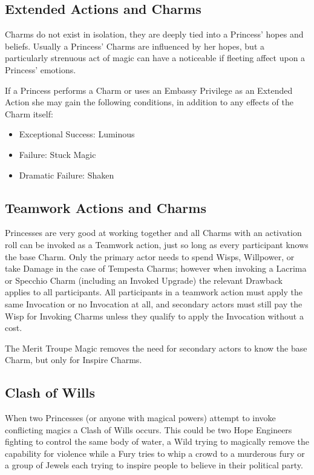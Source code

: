 \subsection*{Extended Actions and Charms}

Charms do not exist in isolation, they are deeply tied into a Princess' hopes and beliefs. Usually a Princess' Charms are influenced by her hopes, but a particularly strenuous act of magic can have a noticeable if fleeting affect upon a Princess' emotions. 

If a Princess performs a Charm or uses an Embassy Privilege as an Extended Action she may gain the following conditions, in addition to any effects of the Charm itself: 

\begin{itemize}
 \item Exceptional Success: Luminous
 \item Failure: Stuck Magic
 \item Dramatic Failure: Shaken
\end{itemize}

\subsection*{Teamwork Actions and Charms}

Princesses are very good at working together and all Charms with an activation roll can be invoked as a Teamwork action, just so long as every participant knows the base Charm. Only the primary actor needs to spend Wisps, Willpower, or take Damage in the case of Tempesta Charms; however when invoking a Lacrima or Specchio Charm (including an Invoked Upgrade) the relevant Drawback applies to all participants. All participants in a teamwork action must apply the same Invocation or no Invocation at all, and secondary actors must still pay the Wisp for Invoking Charms unless they qualify to apply the Invocation without a cost. 

The Merit Troupe Magic removes the need for secondary actors to know the base Charm, but only for Inspire Charms. 

\subsection*{Clash of Wills}

When two Princesses (or anyone with magical powers) attempt to invoke conflicting magics a Clash of Wills occurs. This could be two Hope Engineers fighting to control the same body of water, a Wild trying to magically remove the capability for violence while a Fury tries to whip a crowd to a murderous fury or a group of Jewels each trying to inspire people to believe in their political party. 

